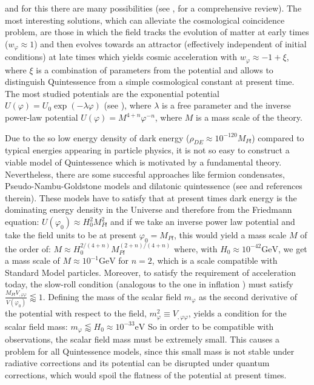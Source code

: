 and for this there are many possibilities (see \cite[chap. 7]{amendola_dark_2010}, for a comprehensive review).
The most interesting solutions, which can alleviate the cosmological coincidence problem, are those in which the field
tracks the evolution of matter at early times ($w_\varphi \approx 1$) and then 
evolves towards an attractor (effectively independent of initial conditions) 
at late times which yields cosmic acceleration with $w_\varphi \approx -1+\xi$,
where $\xi$ is a combination of parameters from the potential and allows
to distinguish Quintessence from a simple cosmological constant at present time.
The most studied potentials are the exponential potential $U(\varphi) = U_0\exp(-\lambda \varphi)$ 
(see \cite{copeland}), where $\lambda$ is a free parameter
and the inverse power-law potential $U(\varphi) = M^{4+n} \varphi^{-n}$,
where $M$ is a mass scale of the theory.

Due to the so low energy density of dark energy ($\rho_{DE} \approx 10 ^{-120} M_{Pl}$)
compared to typical energies appearing in particle physics, it is not so easy to construct a 
viable model of Quintessence which is motivated by a fundamental theory. Nevertheless, there are 
some succesful approaches like fermion condensates, Pseudo-Nambu-Goldstone models and 
dilatonic quintessence (see \cite{amendola_dark_2010} and references therein).
These models have to satisfy that at present times dark energy is the dominating 
energy density in the Universe and therefore from the Friedmann equation:
\beeqc$
U(\varphi_0) \approx H_0^2 M_{Pl}^2
$
and if we take an inverse power law potential and take the field units to be at present $\varphi_0 = M_{Pl}$,
this would yield a mass scale $M$ of the order
of:
\beeqc$
M \approx H_0^{2/(4+n)} M_{Pl}^{(2+n)/(4+n)}
$
where, with $H_0 \approx 10^{-42} \mathrm{GeV} $, we get a mass scale of $M \approx 10^{-1} \mathrm{GeV}$
for $n=2$, which is a scale compatible with Standard Model particles.
Moreover, to satisfy the requirement of acceleration today, 
the slow-roll condition (analogous to the one in inflation \cite{infl}) must satisfy 
$ \frac{M_{Pl} V_{,\varphi \varphi}}{V(\varphi_0)} \lessapprox 1$.
Defining the mass of the scalar field $m_\varphi$ as the second derivative of the potential with respect to the field,
$m^2_\varphi \equiv  V_{,\varphi \varphi} $, yields a condition for the scalar field mass:
\beeqp$
m_\varphi \lessapprox H_0 \approx 10^{-33} \mathrm{eV}
$
So in order to be compatible with observations, 
the scalar field mass must be extremely small.
This causes a problem for all Quintessence models,
since this small mass is not stable under radiative corrections
and its potential can be disrupted under quantum corrections,
which would spoil the flatness of the potential at present times.


